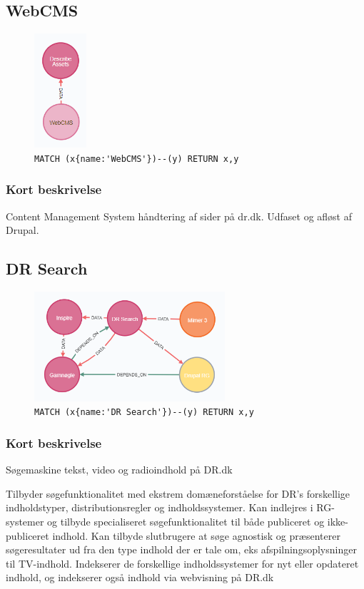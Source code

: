\documentclass{article}
\begin{document}
\subsection{WebCMS}
\begin{figure}[H]
\includegraphics[height=120pt]{WebCMS.PNG}
\cprotect\caption{\verb|MATCH (x{name:'WebCMS'})--(y) RETURN x,y|}
\end{figure}
\subsubsection*{Kort beskrivelse}
Content Management System håndtering af sider på dr.dk. Udfaset og afløst af Drupal.



\subsection{DR Search}
\begin{figure}[H]
\includegraphics[width=200pt]{DRSearch.PNG}
\cprotect\caption{\verb|MATCH (x{name:'DR Search'})--(y) RETURN x,y|}
\end{figure}
\subsubsection*{Kort beskrivelse}
Søgemaskine tekst, video og radioindhold på DR.dk	

Tilbyder søgefunktionalitet med ekstrem domæneforståelse for DR's forskellige indholdstyper, distributionsregler og indholdssystemer. Kan indlejres i RG-systemer og tilbyde specialiseret søgefunktionalitet til både publiceret og ikke-publiceret indhold. Kan tilbyde slutbrugere at søge agnostisk og præsenterer søgeresultater ud fra den type indhold der er tale om, eks afspilningsoplysninger til TV-indhold. Indekserer de forskellige indholdssystemer for nyt eller opdateret indhold, og indekserer også indhold via webvisning på DR.dk
\end{document}
